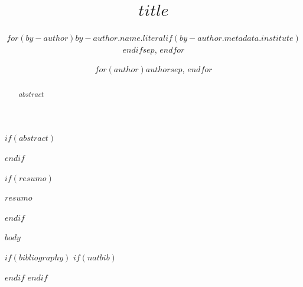 \documentclass[12pt]{article}
\title{$title$}
\author{$for(by-author)$$by-author.name.literal$$if(by-author.metadata.institute)$\inst{$by-author.metadata.institute$}$endif$$sep$, $endfor$}
\author{$for(author)$$author$$sep$, $endfor$}
\begin{document}
\maketitle

$if(abstract)$
\begin{abstract}
$abstract$
\end{abstract}
$endif$

$if(resumo)$
\begin{resumo}
$resumo$
\end{resumo}
$endif$

$body$

$if(bibliography)$
$if(natbib)$


$endif$
$endif$
\end{document}

